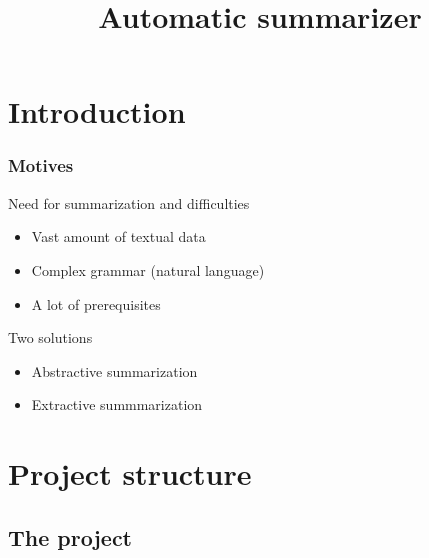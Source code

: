 \documentclass{beamer}
\title{Automatic summarizer}
\author{}
\institute{École polytechnique}
\date{}
\begin{document}
\begin{frame}
  \titlepage{}
\end{frame}




\section{Introduction}

    \begin{frame}%
    \frametitle{Motives}%

        \begin{block}{Need for summarization and difficulties}
            \begin{itemize}
                \item Vast amount of textual data
                \item Complex grammar (natural language)
                \item A lot of prerequisites
            \end{itemize}
        \end{block}


        \begin{block}{Two solutions}
            \begin{itemize}
                \item Abstractive summarization
                \item Extractive summmarization
            \end{itemize}
        \end{block}
    \end{frame}

\section{Project structure}
    \subsection{The project}
\end{document}
